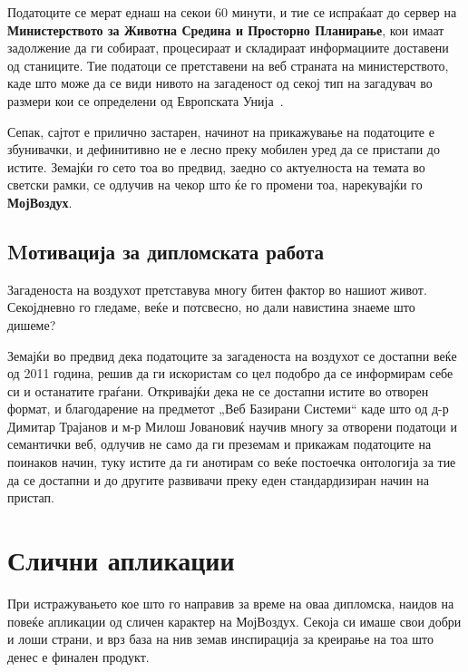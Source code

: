 \documentclass{uvamscse}
\begin{document}
Податоците се мерат еднаш на секои 60 минути, и тие се испраќаат до сервер на \textbf{Министерството за Животна Средина и Просторно Планирање}, кои имаат задолжение да ги собираат, процесираат и складираат информациите доставени од станиците. Тие податоци се претставени на веб страната на министерството, каде што може да се види нивото на загаденост од секој тип на загадувач во размери кои се определени од Европската Унија~\cite{eulimits}.
\vspace{5mm}

Сепак, сајтот е прилично застарен, начинот на прикажување на податоците е збунивачки, и дефинитивно не е лесно преку мобилен уред да се пристапи до истите. Земајќи го сето тоа во предвид, заедно со актуелноста на темата во светски рамки, се одлучив на чекор што ќе го промени тоа, нарекувајќи го \textbf{МојВоздух}.

\section{Mотивација за дипломската работа}

Загаденоста на воздухот претставува многу битен фактор во нашиот живот. Секојдневно го гледаме, веќе и потсвесно, но дали навистина знаеме што дишеме?
\vspace{5mm}

Земајќи во предвид дека податоците за загаденоста на воздухот се достапни веќе од 2011 година, решив да ги искористам со цел подобро да се информирам себе си и останатите граѓани. Откривајќи дека не се достапни истите во отворен формат, и благодарение на предметот „Веб Базирани Системи“ каде што од д-р Димитар Трајанов и м-р Милош Јовановиќ научив многу за отворени податоци и семантички веб, одлучив не само да ги преземам и прикажам податоците на поинаков начин, туку истите да ги анотирам со веќе постоечка онтологија за тие да се достапни и до другите развивачи преку еден стандардизиран начин на пристап.

\chapter{Слични апликации}
При истражувањето кое што го направив за време на оваа дипломска, наидов на повеќе апликации од сличен карактер на МојВоздух. Секоја си имаше свои добри и лоши страни, и врз база на нив земав инспирација за креирање на тоа што денес е финален продукт.
\end{document}
